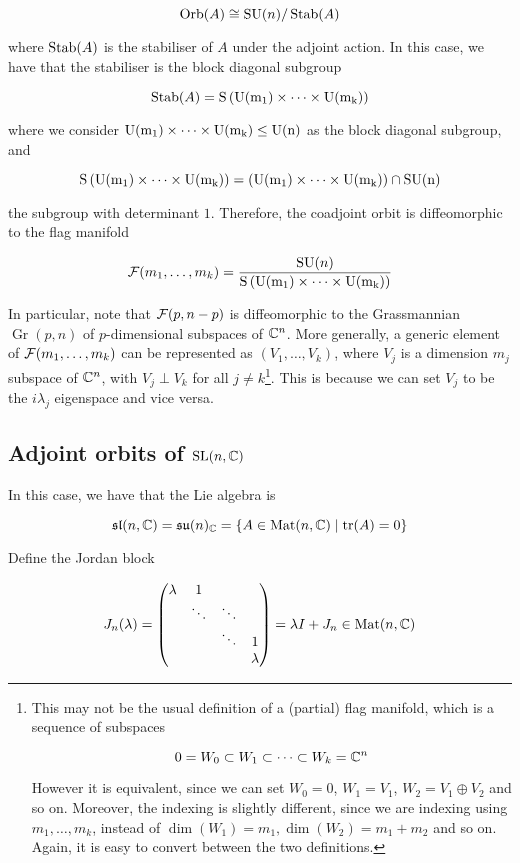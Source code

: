 \documentclass{article}
\DeclareMathOperator{\SU}{SU}
\newcommand{\su}{\mathfrak{su}}
\renewcommand{\sl}{\mathfrak{sl}}
\DeclareMathOperator{\Gr}{Gr}
\begin{document}
\[\Orb(A) \cong \SU(n)/\Stab(A)\]

where \(\operatorname{Stab}(A)\) is the stabiliser of \(A\) under the adjoint action. In this case, we have that the stabiliser is the block diagonal subgroup

\[\operatorname{Stab}(A) = \rm S\left(\rm U(m_1) \times \dots \times \rm U(m_k)\right)\]

where we consider \(\rm U(m_1) \times \cdots \times \rm U(m_k) \le \rm U(n)\) as the block diagonal subgroup, and

\[\rm S\left(\rm U(m_1) \times \dots \times \rm U(m_k)\right) = \left(\rm U(m_1) \times \cdots \times \rm U(m_k)\right) \cap \SU(n)\]

the subgroup with determinant \(1\). Therefore, the coadjoint orbit is diffeomorphic to the flag manifold

\[\mcF(m_1, \dots, m_k) = \frac{\SU(n)}{\rm S\left(\rm U(m_1) \times \cdots \times \rm U(m_k)\right)}\]

In particular, note that \(\mathcal{F}(p, n-p)\) is diffeomorphic to the Grassmannian \(\Gr(p, n)\) of \(p\)-dimensional subspaces of \(\mathbb{C}^n\). More generally, a generic element of \(\mathcal{F}(m_1, \dots, m_k)\) can be represented as \((V_1, \dots, V_k)\), where \(V_j\) is a dimension \(m_j\) subspace of \(\mathbb{C}^n\), with \(V_j \perp V_k\) for all \(j \ne k\)\footnote{This may not be the usual definition of a (partial) flag manifold, which is a sequence of subspaces 

\[0 = W_0 \subset W_1 \subset \cdots \subset W_k = \mathbb{C}^n\]

However it is equivalent, since we can set \(W_0 = 0\), \(W_1 = V_1\), \(W_2 = V_1 \oplus V_2\) and so on. Moreover, the indexing is slightly different, since we are indexing using \(m_1, \dots, m_k\), instead of \(\dim(W_1) = m_1, \dim(W_2) = m_1 + m_2\) and so on. Again, it is easy to convert between the two definitions.}. This is because we can set \(V_j\) to be the \(i\lambda_j\) eigenspace and vice versa.

\subsection{Adjoint orbits of \(\operatorname{SL}(n, \mathbb{C})\)}

In this case, we have that the Lie algebra is

\[\sl(n, \C) = \su(n)_\C = \left\{A \in \Mat(n, \C) \mid \tr(A) = 0\right\}\]

Define the Jordan block

\[J_n(\lambda) = \begin{pmatrix}
    \lambda & 1 \\
    & \ddots & \ddots \\
    & & \ddots & 1 \\
    & & & \lambda
\end{pmatrix} = \lambda I + J_n \in \operatorname{Mat}(n, \mathbb{C})\]
\end{document}

